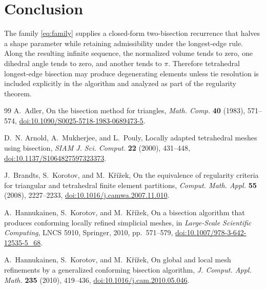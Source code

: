 \documentclass[10pt]{article}
\theoremstyle{definition}
\begin{document}
\section{Conclusion}

The family \eqref{eq:family} supplies a closed-form two-bisection recurrence that halves a shape parameter while retaining admissibility under the longest-edge rule.  Along the resulting infinite sequence, the normalized volume tends to zero, one dihedral angle tends to zero, and another tends to $\pi$.  Therefore tetrahedral longest-edge bisection may produce degenerating elements unless tie resolution is included explicitly in the algorithm and analyzed as part of the regularity theorem.

\small
\begin{thebibliography}{99}
A.~Adler,
\newblock On the bisection method for triangles,
\newblock \emph{Math. Comp.} \textbf{40} (1983), 571--574,
\newblock \href{https://doi.org/10.1090/S0025-5718-1983-0689473-5}{doi:10.1090/S0025-5718-1983-0689473-5}.


D.~N. Arnold, A.~Mukherjee, and L.~Pouly,
\newblock Locally adapted tetrahedral meshes using bisection,
\newblock \emph{SIAM J. Sci. Comput.} \textbf{22} (2000), 431--448,
\newblock \href{https://doi.org/10.1137/S1064827597323373}{doi:10.1137/S1064827597323373}.

J.~Brandts, S.~Korotov, and M.~K\v{r}\'i\v{z}ek,
\newblock On the equivalence of regularity criteria for triangular and tetrahedral finite element partitions,
\newblock \emph{Comput. Math. Appl.} \textbf{55} (2008), 2227--2233,
\newblock \href{https://doi.org/10.1016/j.camwa.2007.11.010}{doi:10.1016/j.camwa.2007.11.010}.

A.~Hannukainen, S.~Korotov, and M.~K\v{r}\'i\v{z}ek,
\newblock On a bisection algorithm that produces conforming locally refined simplicial meshes,
\newblock in \emph{Large-Scale Scientific Computing}, LNCS 5910, Springer, 2010, pp.~571--579,
\newblock \href{https://doi.org/10.1007/978-3-642-12535-5_68}{doi:10.1007/978-3-642-12535-5\_68}.

A.~Hannukainen, S.~Korotov, and M.~K\v{r}\'i\v{z}ek,
\newblock On global and local mesh refinements by a generalized conforming bisection algorithm,
\newblock \emph{J. Comput. Appl. Math.} \textbf{235} (2010), 419--436,
\newblock \href{https://doi.org/10.1016/j.cam.2010.05.046}{doi:10.1016/j.cam.2010.05.046}.


\end{thebibliography}
\end{document}

